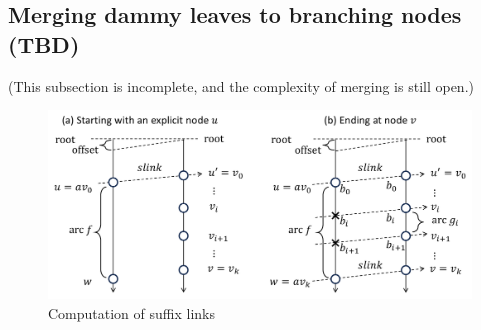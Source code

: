 \documentclass{article}
\begin{document}
\subsection{Merging dammy leaves to branching nodes (TBD)}
(This subsection is incomplete, and the complexity of merging is  still open.)

\begin{figure}[t]
\centering
\includegraphics[height=0.4\textwidth]{fig3.pdf}
\vspace{.5\baselineskip}
\caption{Computation of suffix links}\label{fig:example:arrays}
\end{figure}
\end{document}
